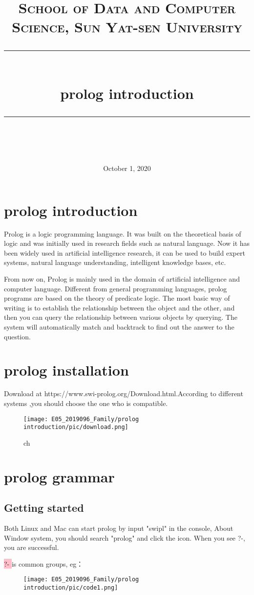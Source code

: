 \documentclass[a4paper, 11pt]{article}
\title{	
\normalfont \normalsize
\textsc{School of Data and Computer Science, Sun Yat-sen University} \\ [25pt] %
\rule{\textwidth}{0.5pt} \\[0.4cm] %
\huge  prolog  introduction \\ %
\rule{\textwidth}{2pt} \\[0.5cm] %
\date{\normalsize October 1, 2020} 
}
\begin{document}
\maketitle
\tableofcontents
\newpage

\section{prolog introduction}
Prolog is a logic programming language. It was built on the theoretical basis of logic and was initially used in research fields such as natural language. Now it has been widely used in artificial intelligence research, it can be used to build expert systems, natural language understanding, intelligent knowledge bases, etc.

From now on, Prolog is mainly used in the domain of artificial intelligence and computer language. Different from general programming languages, prolog programs are based on the theory of predicate logic. The most basic way of writing is to establish the relationship between the object and the other, and then you can query the relationship between various objects by querying. The system will automatically match and backtrack to find out the answer to the question.

\section{prolog installation}
Download at https://www.swi-prolog.org/Download.html.According to different systems ,you should choose the one who is compatible.
\begin{figure}[ht]
\centering
\texttt{[image: E05\_2019096\_Family/prolog introduction/pic/download.png]}
\caption{ch}
\label{fig:label}
\end{figure}

\section{prolog grammar}
\subsection{Getting started}
Both Linux and Mac can start prolog by input "swipl" in the console, About Window system, you should search "prolog" and click the icon.  When you see ?-, you are successful.

\colorbox{pink}{\color{black} ?- }is common groups, eg：
\begin{figure}[ht]
\centering
\texttt{[image: E05\_2019096\_Family/prolog introduction/pic/code1.png]}
\label{fig:label}
\end{figure}
\end{document}
